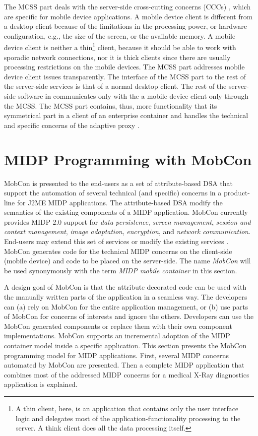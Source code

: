 The MCSS part deals with the server-side cross-cutting concerns (CCCs) \cite{parnas.72,kiczalesetal.97}, which are specific for mobile device applications. A mobile device client is different from a desktop client because of the limitations in the processing power, or hardware configuration, e.g., the size of the screen, or the available memory. A mobile device client is neither a thin\footnote{A thin client, here, is an application that contains only the user interface logic and delegates most of the application-functionality processing to the server. A think client does all the data processing itself.} client, because it should be able to work with sporadic network connections, nor it is thick clients since there are usually processing restrictions on the mobile devices. 
The MCSS part addresses mobile device client issues transparently. The interface of the MCSS part to the rest of the server-side services is that of a normal desktop client. The rest of the server-side software in  communicates only with the a mobile device client only through the MCSS. The MCSS part contains, thus, more functionality that its symmetrical part in a client of an enterprise container and handles the technical and specific concerns of the adaptive proxy \cite{fox98adapting}.

\section{MIDP Programming with MobCon}
\label{sec.mc.prog}

MobCon is presented to the end-users as a set of attribute-based DSA that support the automation of several technical (and specific) concerns in a product-line for J2ME MIDP applications. The attribute-based DSA modify the semantics of the existing components of a MIDP application. MobCon currently provides MIDP 2.0 support for \textit{data persistence}, \textit{screen management}, \textit{session and context management}, \textit{image adaptation}, \textit{encryption}, and \textit{network communication}. End-users may extend this set of services or modify the existing services . MobCon generates code for the technical MIDP concerns on the client-side (mobile device) and code to be placed on the server-side. The name \textit{MobCon} will be used synonymously with the term \textit{MIDP mobile container} in this section.

A design goal of MobCon is that the attribute decorated code can be used with the manually written parts of the application in a seamless way. The developers can (a) rely on MobCon for the entire application management, or (b) use parts of MobCon for concerns of interests and ignore the others. Developers can use the MobCon generated components or replace them with their own component implementations. MobCon supports an incremental adoption of the MIDP container model inside a specific application. This section presents the MobCon programming model for MIDP applications. First, several MIDP concerns automated by MobCon are presented. Then a complete MIDP application that combines most of the addressed MIDP concerns for a medical X-Ray diagnostics application is explained.

